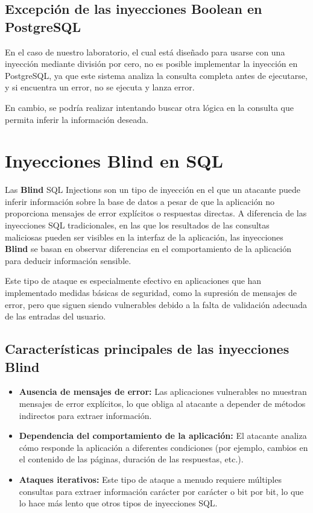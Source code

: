 \documentclass[a4paper,12pt]{article}
\begin{document}
\subsection{Excepción de las inyecciones Boolean en PostgreSQL}

En el caso de nuestro laboratorio, el cual está diseñado para usarse con una inyección mediante división por cero, no es posible implementar la inyección en PostgreSQL, ya que este sistema analiza la consulta completa antes de ejecutarse, y si encuentra un error, no se ejecuta y lanza error.

En cambio, se podría realizar intentando buscar otra lógica en la consulta que permita inferir la información deseada.
\section{Inyecciones Blind en SQL}
Las \textbf{Blind} SQL Injections son un tipo de inyección en el que un atacante puede inferir información sobre la base de datos a pesar de que la aplicación no proporciona mensajes de error explícitos o respuestas directas. A diferencia de las inyecciones SQL tradicionales, en las que los resultados de las consultas maliciosas pueden ser visibles en la interfaz de la aplicación, las inyecciones \textbf{Blind} se basan en observar diferencias en el comportamiento de la aplicación para deducir información sensible.

Este tipo de ataque es especialmente efectivo en aplicaciones que han implementado medidas básicas de seguridad, como la supresión de mensajes de error, pero que siguen siendo vulnerables debido a la falta de validación adecuada de las entradas del usuario.

\subsection{Características principales de las inyecciones Blind}

\begin{itemize}
    \item \textbf{Ausencia de mensajes de error:} 
    Las aplicaciones vulnerables no muestran mensajes de error explícitos, lo que obliga al atacante a depender de métodos indirectos para extraer información.

    \item \textbf{Dependencia del comportamiento de la aplicación:} 
    El atacante analiza cómo responde la aplicación a diferentes condiciones (por ejemplo, cambios en el contenido de las páginas, duración de las respuestas, etc.).

    \item \textbf{Ataques iterativos:} 
    Este tipo de ataque a menudo requiere múltiples consultas para extraer información carácter por carácter o bit por bit, lo que lo hace más lento que otros tipos de inyecciones SQL.
\end{itemize}
\end{document}
